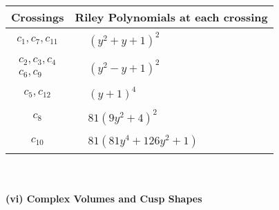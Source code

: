 \documentclass[1p]{elsarticle_modified}
\theoremstyle{definition}
\begin{document}
\begin{tabular}{m{50pt}|m{274pt}}
Crossings & \hspace{64pt}Riley Polynomials at each crossing \\
\hline $$\begin{aligned}c_{1},c_{7},c_{11}\end{aligned}$$&$\begin{aligned}
&(y^2+y+1)^2
\end{aligned}$\\
\hline $$\begin{aligned}c_{2},c_{3},c_{4}\\c_{6},c_{9}\end{aligned}$$&$\begin{aligned}
&(y^2- y+1)^2
\end{aligned}$\\
\hline $$\begin{aligned}c_{5},c_{12}\end{aligned}$$&$\begin{aligned}
&(y+1)^4
\end{aligned}$\\
\hline $$\begin{aligned}c_{8}\end{aligned}$$&$\begin{aligned}
&81(9 y^2+4)^2
\end{aligned}$\\
\hline $$\begin{aligned}c_{10}\end{aligned}$$&$\begin{aligned}
&81(81 y^4+126 y^2+1)
\end{aligned}$\\
\hline
\end{tabular}\\~\\
\newpage\flushleft \textbf{(vi) Complex Volumes and Cusp Shapes}
\end{document}
